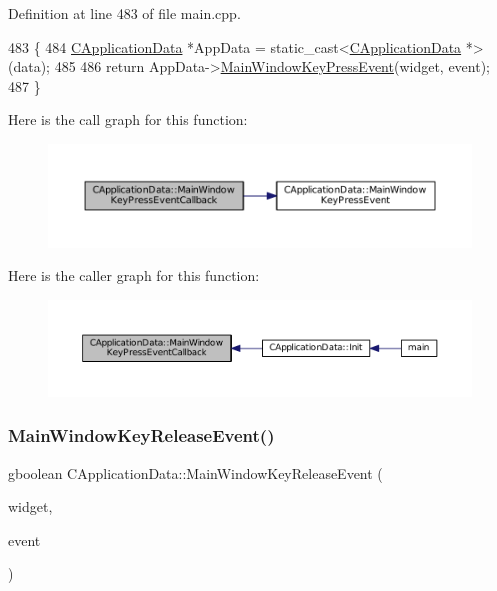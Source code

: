 Definition at line 483 of file main.\+cpp.


\begin{DoxyCode}
483                                                                                                            
         \{
484     \hyperlink{classCApplicationData}{CApplicationData} *AppData = \textcolor{keyword}{static\_cast<}\hyperlink{classCApplicationData}{CApplicationData} *\textcolor{keyword}{>}(data);
485 
486     \textcolor{keywordflow}{return} AppData->\hyperlink{classCApplicationData_a9b451765c93ecf00322f5450d29bfffe}{MainWindowKeyPressEvent}(widget, event);
487 \}
\end{DoxyCode}
Here is the call graph for this function\+:\nopagebreak
\begin{figure}[H]
\begin{center}
\leavevmode
\includegraphics[width=350pt]{classCApplicationData_aca6cce5b1cd5142984d2880294ff6ed4_cgraph}
\end{center}
\end{figure}
Here is the caller graph for this function\+:\nopagebreak
\begin{figure}[H]
\begin{center}
\leavevmode
\includegraphics[width=350pt]{classCApplicationData_aca6cce5b1cd5142984d2880294ff6ed4_icgraph}
\end{center}
\end{figure}
\hypertarget{classCApplicationData_aff9f46bccd458a0dcca968e4a46c7d9b}{}\label{classCApplicationData_aff9f46bccd458a0dcca968e4a46c7d9b} 
\subsubsection{\texorpdfstring{Main\+Window\+Key\+Release\+Event()}{MainWindowKeyReleaseEvent()}}
{\footnotesize\ttfamily gboolean C\+Application\+Data\+::\+Main\+Window\+Key\+Release\+Event (\begin{DoxyParamCaption}\item[{Gtk\+Widget $\ast$}]{widget,  }\item[{Gdk\+Event\+Key $\ast$}]{event }\end{DoxyParamCaption})\hspace{0.3cm}{\ttfamily [protected]}}



